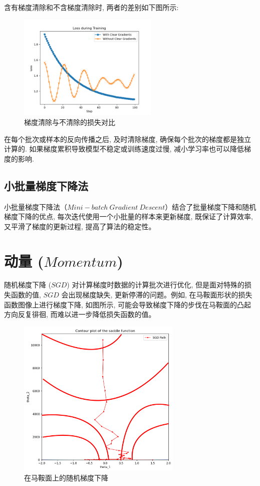 \documentclass[printMode=true, declarePage=false]{ecnuthesis}
\begin{document}
    含有梯度清除和不含梯度清除时, 两者的差别如下图所示:

    \begin{figure} [H]
        \centering
        \includegraphics[width=0.6\textwidth]{../lectures/img/clear-gradients.png}
        \caption{梯度清除与不清除的损失对比}
    \end{figure}

    在每个批次或样本的反向传播之后, 及时清除梯度, 确保每个批次的梯度都是独立计算的.
    如果梯度累积导致模型不稳定或训练速度过慢, 减小学习率也可以降低梯度的影响.

    \subsection{小批量梯度下降法}
    小批量梯度下降法（$Mini-batch\ Gradient\ Descent$）结合了批量梯度下降和随机梯度下降的优点, 每次迭代使用一个小批量的样本来更新梯度, 既保证了计算效率, 又平滑了梯度的更新过程, 提高了算法的稳定性。


    \section{动量 ($Momentum$)}

    随机梯度下降 ($SGD$) 对计算梯度时数据的计算批次进行优化, 但是面对特殊的损失函数的值, $SGD$ 会出现梯度缺失, 更新停滞的问题。例如, 在马鞍面形状的损失函数图像上进行梯度下降, 如图所示, 可能会导致梯度下降的步伐在马鞍面的凸起方向反复徘徊, 而难以进一步降低损失函数的值。

    \begin{figure}[H]
        \centering
        \includegraphics[width=0.7\textwidth]{../lectures/img/saddle-no-momentum-sgd.jpg}
        \caption{在马鞍面上的随机梯度下降}
    \end{figure}
\end{document}
